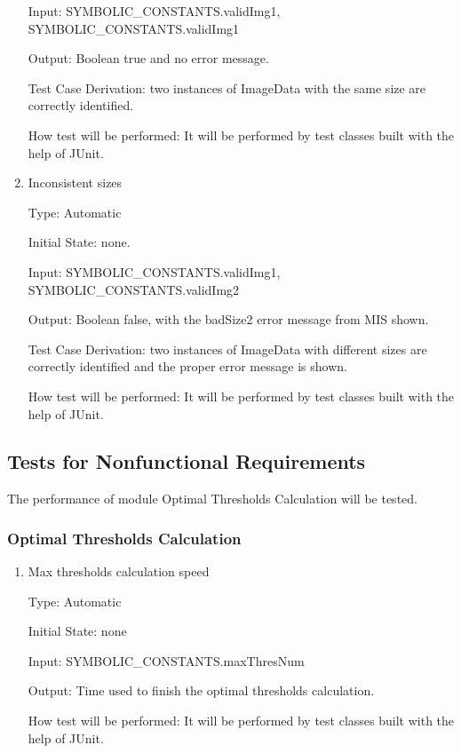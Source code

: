 \documentclass[12pt, titlepage]{article}
\begin{document}
\begin{enumerate}
Input: SYMBOLIC\_CONSTANTS.validImg1, SYMBOLIC\_CONSTANTS.validImg1
					
Output: Boolean true and no error message.

Test Case Derivation: two instances of ImageData with the same size are
correctly identified.

How test will be performed: It will be performed by test classes built with the
help of JUnit.

\item{Inconsistent sizes\\}

Type: Automatic
					
Initial State: none.
					
Input: SYMBOLIC\_CONSTANTS.validImg1, SYMBOLIC\_CONSTANTS.validImg2
					
Output: Boolean false, with the badSize2 error message from MIS shown.

Test Case Derivation: two instances of ImageData with different sizes are
correctly identified and the proper error message is shown.

How test will be performed: It will be performed by test classes built with the
help of JUnit.

\end{enumerate}

\subsection{Tests for Nonfunctional Requirements}

The performance of module Optimal Thresholds Calculation will be tested.

\subsubsection{Optimal Thresholds Calculation}
\label{sec_thresCalPerformance}

\begin{enumerate}

\item{Max thresholds calculation speed\\}

Type: Automatic
					
Initial State: none
					
Input: SYMBOLIC\_CONSTANTS.maxThresNum
					
Output: Time used to finish the optimal thresholds calculation.
					
How test will be performed: It will be performed by test classes built with the
help of JUnit.

\end{enumerate}
\end{document}
